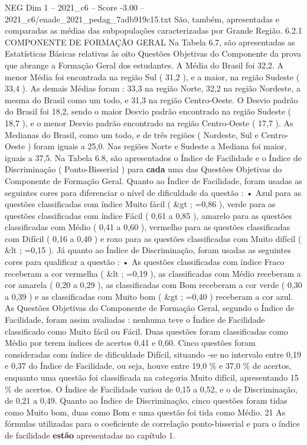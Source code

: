 \begin{textsample}{NEG Dim 1 – 2021\_c6 – Score -3.00 – 2021\_c6/enade\_2021\_pedag\_7adb919c15.txt}
São, também, apresentadas e comparadas as médias das subpopulações caracterizadas por Grande Região. 6.2.1 COMPONENTE DE FORMAÇÃO GERAL Na Tabela 6.7, são apresentadas as Estatísticas Básicas relativas às oito Questões Objetivas do Componente da prova que abrange a Formação Geral dos estudantes.
A Média do Brasil foi 32,2.
A menor Média foi encontrada na região Sul ( 31,2 ), e a maior, na região Sudeste ( 33,4 ).
As demais Médias foram : 33,3 na região Norte, 32,2 na região Nordeste, a mesma do Brasil como um todo, e 31,3 na região Centro-Oeste.
O Desvio padrão do Brasil foi 18,2, sendo o maior Desvio padrão encontrado na região Sudeste ( 18,7 ), e o menor Desvio padrão encontrado na região Centro-Oeste ( 17,7 ).
As Medianas do Brasil, como um todo, e de três regiões ( Nordeste, Sul e Centro-Oeste ) foram iguais a 25,0.
Nas regiões Norte e Sudeste a Mediana foi maior, iguais a 37,5.
Na Tabela 6.8, são apresentados o Índice de Facilidade e o Índice de Discriminação ( Ponto-Bisserial ) para \textbf{cada} uma das Questões Objetivas do Componente de Formação Geral.
Quanto ao Índice de Facilidade, foram usadas as seguintes cores para diferenciar o nível de dificuldade da questão : • Azul para as questões classificadas com índice Muito fácil ( \&gt ; =0,86 ), verde para as questões classificadas com índice Fácil ( 0,61 a 0,85 ), amarelo para as questões classificadas com Médio ( 0,41 a 0,60 ), vermelho para as questões classificadas com Difícil ( 0,16 a 0,40 ) e roxo para as questões classificadas com Muito difícil ( \&lt ; =0,15 ).
Já quanto ao Índice de Discriminação, foram usadas as seguintes cores para qualificar a questão : • As questões classificadas com índice Fraco receberam a cor vermelha ( \&lt ; =0,19 ), as classificadas com Médio receberam a cor amarela ( 0,20 a 0,29 ), as classificadas com Bom receberam a cor verde ( 0,30 a 0,39 ) e as classificadas com Muito bom ( \&gt ; =0,40 ) receberam a cor azul.
As Questões Objetivas do Componente de Formação Geral, segundo o Índice de Facilidade, foram assim avaliadas : nenhuma teve o Índice de Facilidade classificado como Muito fácil ou Fácil.
Duas questões foram classificadas como Médio por terem índices de acertos 0,41 e 0,60.
Cinco questões foram consideradas com índice de dificuldade Difícil, situando -se no intervalo entre 0,19 e 0,37 do Índice de Facilidade, ou seja, houve entre 19,0 \% e 37,0 \% de acertos, enquanto uma questão foi classificada na categoria Muito difícil, apresentando 15 \% de acertos.
O Índice de Facilidade variou de 0,15 a 0,52, e o de Discriminação, de 0,21 a 0,49.
Quanto ao Índice de Discriminação, cinco questões foram tidas como Muito bom, duas como Bom e uma questão foi tida como Médio. 21 As fórmulas utilizadas para o coeficiente de correlação ponto-bisserial e para o índice de facilidade \textbf{estão} apresentadas no capítulo 1.

\end{textsample}
